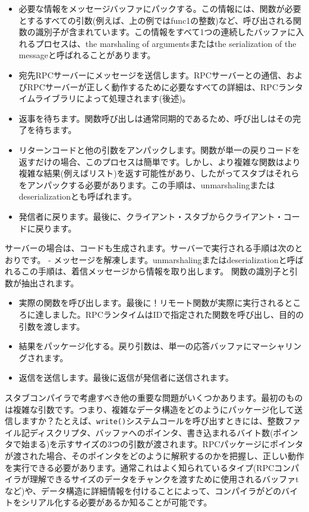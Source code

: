 \begin{itemize}
\item
  必要な情報をメッセージバッファにパックする。この情報には、関数が必要とするすべての引数(例えば、上の例ではfunc1の整数)など、呼び出される関数の識別子が含まれています。この情報をすべて1つの連続したバッファに入れるプロセスは、the
  marshaling of argumentsまたはthe serialization of the
  messageと呼ばれることがあります。
\item
  宛先RPCサーバーにメッセージを送信します。RPCサーバーとの通信、およびRPCサーバーが正しく動作するために必要なすべての詳細は、RPCランタイムライブラリによって処理されます(後述)。
\item
  返事を待ちます。関数呼び出しは通常同期的であるため、呼び出しはその完了を待ちます。
\item
  リターンコードと他の引数をアンパックします。関数が単一の戻りコードを返すだけの場合、このプロセスは簡単です。しかし、より複雑な関数はより複雑な結果(例えばリスト)を返す可能性があり、したがってスタブはそれらをアンパックする必要があります。この手順は、unmarshalingまたはdeserializationとも呼ばれます。
\item
  発信者に戻ります。最後に、クライアント・スタブからクライアント・コードに戻ります。
\end{itemize}

サーバーの場合は、コードも生成されます。サーバーで実行される手順は次のとおりです。
-
メッセージを解凍します。unmarshalingまたはdeserializationと呼ばれるこの手順は、着信メッセージから情報を取り出します。
関数の識別子と引数が抽出されます。

\begin{itemize}
\item
  実際の関数を呼び出します。最後に！リモート関数が実際に実行されるところに達しました。RPCランタイムはIDで指定された関数を呼び出し、目的の引数を渡します。
\item
  結果をパッケージ化する。戻り引数は、単一の応答バッファにマーシャリングされます。
\item
  返信を送信します。最後に返信が発信者に送信されます。
\end{itemize}

スタブコンパイラで考慮すべき他の重要な問題がいくつかあります。最初のものは複雑な引数です。つまり、複雑なデータ構造をどのようにパッケージ化して送信しますか？たとえば、\texttt{write()}システムコールを呼び出すときには、整数ファイル記ディスクリプタ、バッファへのポインタ、書き込まれるバイト数(ポインタで始まる)を示すサイズの3つの引数が渡されます。RPCパッケージにポインタが渡された場合、そのポインタをどのように解釈するのかを把握し、正しい動作を実行できる必要があります。通常これはよく知られているタイプ(RPCコンパイラが理解できるサイズのデータをチャンクを渡すために使用されるバッファtなど)や、データ構造に詳細情報を付けることによって、コンパイラがどのバイトをシリアル化する必要があるか知ることが可能です。

